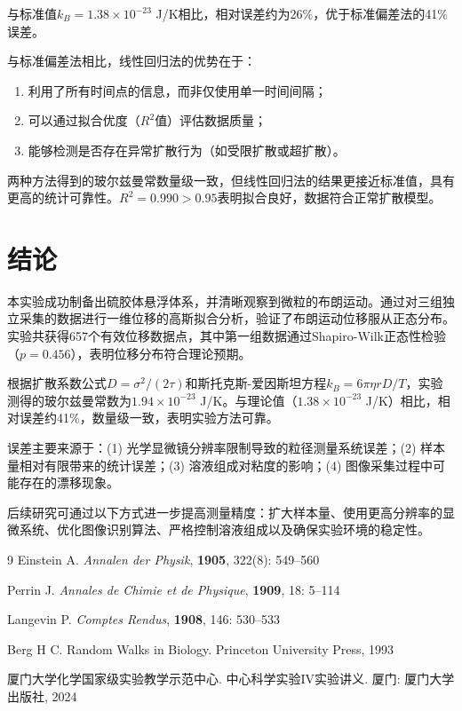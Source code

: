 \documentclass[a4paper]{article}
\begin{document}
与标准值$k_B = 1.38\times10^{-23}$ J/K相比，相对误差约为26\%，优于标准偏差法的41\%误差。

与标准偏差法相比，线性回归法的优势在于：
\begin{enumerate}[label=(\arabic*),leftmargin=3em]
	\item 利用了所有时间点的信息，而非仅使用单一时间间隔；
	\item 可以通过拟合优度（$R^2$值）评估数据质量；
	\item 能够检测是否存在异常扩散行为（如受限扩散或超扩散）。
\end{enumerate}

两种方法得到的玻尔兹曼常数量级一致，但线性回归法的结果更接近标准值，具有更高的统计可靠性。$R^2 = 0.990 > 0.95$表明拟合良好，数据符合正常扩散模型。

\clearpage

\section{结论}
\vspace{-0.5em}

本实验成功制备出硫胶体悬浮体系，并清晰观察到微粒的布朗运动。通过对三组独立采集的数据进行一维位移的高斯拟合分析，验证了布朗运动位移服从正态分布。实验共获得657个有效位移数据点，其中第一组数据通过Shapiro-Wilk正态性检验（$p = 0.456$），表明位移分布符合理论预期。

根据扩散系数公式$D = \sigma^2/(2\tau)$和斯托克斯-爱因斯坦方程$k_B = 6\pi\eta rD/T$，实验测得的玻尔兹曼常数为$1.94\times10^{-23}$ J/K。与理论值（$1.38\times10^{-23}$ J/K）相比，相对误差约41\%，数量级一致，表明实验方法可靠。

误差主要来源于：(1) 光学显微镜分辨率限制导致的粒径测量系统误差；(2) 样本量相对有限带来的统计误差；(3) 溶液组成对粘度的影响；(4) 图像采集过程中可能存在的漂移现象。

后续研究可通过以下方式进一步提高测量精度：扩大样本量、使用更高分辨率的显微系统、优化图像识别算法、严格控制溶液组成以及确保实验环境的稳定性。

\vspace{3em}
{\footnotesize
	\begin{thebibliography}{9}
		Einstein A.
		\textit{Annalen der Physik}, \textbf{1905}, 322(8): 549--560

		Perrin J.
		\textit{Annales de Chimie et de Physique}, \textbf{1909}, 18: 5--114

		Langevin P.
		\textit{Comptes Rendus}, \textbf{1908}, 146: 530--533

		Berg H C.
			{\kaishu Random Walks in Biology}.
		Princeton University Press, 1993

		厦门大学化学国家级实验教学示范中心.
		{\kaishu 中心科学实验IV实验讲义}.
		厦门: 厦门大学出版社, 2024
	\end{thebibliography}
}
\end{document}
